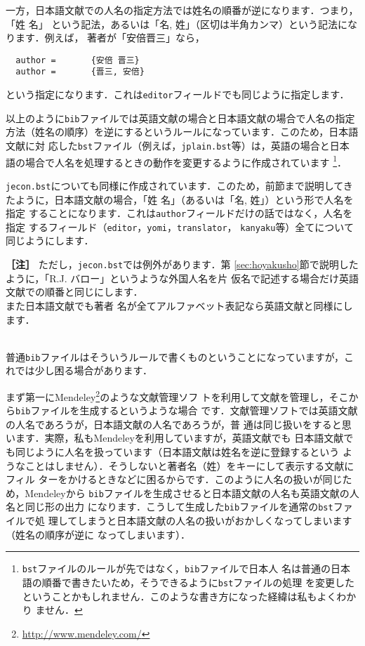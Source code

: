 \documentclass[a4j,10pt]{jarticle}
\begin{document}
一方，日本語文献での人名の指定方法では姓名の順番が逆になります．つまり，「姓 名」
という記法，あるいは「名, 姓」（区切は半角カンマ）という記法になります．例えば，
著者が「安倍晋三」なら，
\begin{screen}
 \begin{verbatim}
  author =       {安倍 晋三}
  author =       {晋三, 安倍}
 \end{verbatim}
\end{screen}
という指定になります．これは\texttt{editor}フィールドでも同じように指定します．
\vspace*{1em}

以上のように\texttt{bib}ファイルでは英語文献の場合と日本語文献の場合で人名の指定
方法（姓名の順序）を逆にするというルールになっています．このため，日本語文献に対
応した\texttt{bst}ファイル（例えば，\texttt{jplain.bst}等）は，英語の場合と日本
語の場合で人名を処理するときの動作を変更するように作成されています
\footnote{\texttt{bst}ファイルのルールが先ではなく，\texttt{bib}ファイルで日本人
名は普通の日本語の順番で書きたいため，そうできるように\texttt{bst}ファイルの処理
を変更したということかもしれません．このような書き方になった経緯は私もよくわかり
ません．}．\vspace*{1em}

\texttt{jecon.bst}についても同様に作成されています．このため，前節まで説明してき
たように，日本語文献の場合，「姓 名」（あるいは「名, 姓」）という形で人名を指定
することになります．これは\texttt{author}フィールドだけの話ではなく，人名を指定
するフィールド（\texttt{editor}，\texttt{yomi}，\texttt{translator}，
\texttt{kanyaku}等）全てについて同じようにします．

\begin{screen}
 \textbf{［注］} ただし，\texttt{jecon.bst}では例外があります．第
 \ref{sec:hoyakusho}節で説明したように，「R.J. バロー」というような外国人名を片
 仮名で記述する場合だけ英語文献での順番と同じにします．\\また日本語文献でも著者
 名が全てアルファベット表記なら英語文献と同様にします．
\end{screen}
\\

普通\texttt{bib}ファイルはそういうルールで書くものということになっていますが，こ
れでは少し困る場合があります．\vspace*{1em}


まず第一にMendeley\footnote{\url{http://www.mendeley.com/}}のような文献管理ソフ
トを利用して文献を管理し，そこから\texttt{bib}ファイルを生成するというような場合
です．文献管理ソフトでは英語文献の人名であろうが，日本語文献の人名であろうが，普
通は同じ扱いをすると思います．実際，私もMendeleyを利用していますが，英語文献でも
日本語文献でも同じように人名を扱っています（日本語文献は姓名を逆に登録するという
ようなことはしません）．そうしないと著者名（姓）をキーにして表示する文献にフィル
ターをかけるときなどに困るからです．このように人名の扱いが同じため，Mendeleyから
\texttt{bib}ファイルを生成させると日本語文献の人名も英語文献の人名と同じ形の出力
になります．こうして生成した\texttt{bib}ファイルを通常の\texttt{bst}ファイルで処
理してしまうと日本語文献の人名の扱いがおかしくなってしまいます（姓名の順序が逆に
なってしまいます）．\vspace*{1em}
\end{document}

